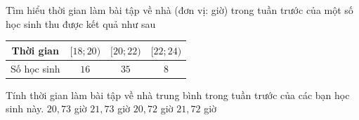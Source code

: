 \begin{ex}%
	Tìm hiểu thời gian làm bài tập về nhà (đơn vị: giờ) trong tuần trước của một số học sinh thu được kết quả như  sau
	\begin{center}
		\begin{tabular}{|c|c|c|c|}
			 \hline
			Thời gian  & $[18;20)$ & $[20;22)$ & $[22;24)$ \\
			\hline 
			Số học sinh & $16$ & $35$ & $8$ \\ 
			\hline 
		\end{tabular}
	\end{center}
	Tính thời gian làm bài tập về  nhà trung bình trong tuần trước của các bạn học sinh này.
	 \choice
		 {\True $20{,}73$ giờ}
		 {$21{,}73$ giờ}
		{$20{,}72$  giờ}
		{$21{,}72$ giờ} 
\end{ex}

